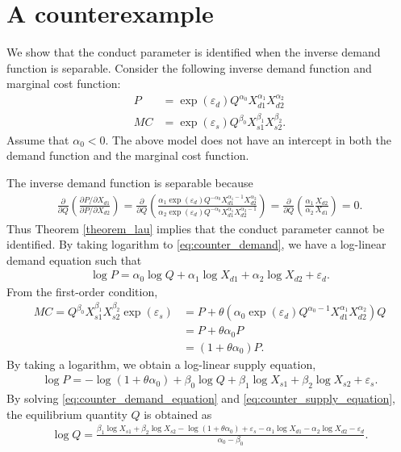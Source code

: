 \documentclass[11pt, a4paper]{article}
\theoremstyle{remark}
\begin{document}
\section{A counterexample}

We show that the conduct parameter is identified when the inverse demand function is separable. 
Consider the following inverse demand function and marginal cost function:
\begin{align}
    P & = \exp(\varepsilon_{d}) Q^{\alpha_0} X_{d1}^{\alpha_1}X_{d2}^{\alpha_2}\label{eq:counter_demand}\\
    MC & = \exp(\varepsilon_{s})Q^{\beta_0} X_{s1}^{\beta_1} X_{s2}^{\beta_2}.\label{eq:counter_mc}
\end{align}
Assume that $\alpha_0 <0$.
The above model does not have an intercept in both the demand function and the marginal cost function. 

The inverse demand function is separable because
\begin{align}
    \frac{\partial }{\partial Q} \left(\frac{\partial P/\partial X_{d1}}{\partial P/\partial X_{d2}} \right) = \frac{\partial }{\partial Q} \left(\frac{\alpha_{1}\exp(\varepsilon_{d}) Q^{-\alpha_0} X_{d1}^{\alpha_1-1}X_{d2}^{\alpha_2}}{\alpha_2\exp(\varepsilon_{d}) Q^{-\alpha_0} X_{d1}^{\alpha_1}X_{d2}^{\alpha_2-1}} \right) =  \frac{\partial }{\partial Q}\left(\frac{\alpha_1}{\alpha_2} \frac{X_{d2}}{X_{d1}} \right)=0.
\end{align}
Thus Theorem \ref{theorem_lau} implies that the conduct parameter cannot be identified.
By taking logarithm to \eqref{eq:counter_demand}, we have a log-linear demand equation such that 
\begin{align}
    \log P = \alpha_0 \log Q + \alpha_1 \log X_{d1}  + \alpha_2 \log X_{d2} + \varepsilon_{d}.\label{eq:counter_demand_equation}
\end{align}
From the first-order condition, 
\begin{align}
    MC = Q^{\beta_0} X_{s1}^{\beta_1}X_{s2}^{\beta_2}\exp(\varepsilon_{s}) & = P + \theta (\alpha_0 \exp(\varepsilon_{d})Q^{\alpha_0-1}X_{d1}^{\alpha_1}X_{d2}^{\alpha_2}) Q\\
    & = P + \theta \alpha_0 P\\
    &= (1 + \theta\alpha_0) P.
\end{align}
By taking a logarithm, we obtain a log-linear supply equation,
\begin{align}
    \log P = - \log(1 + \theta\alpha_0) + \beta_0 \log Q + \beta_1 \log X_{s1}+\beta_2 \log X_{s2} + \varepsilon_{s}.\label{eq:counter_supply_equation}
\end{align}
By solving \eqref{eq:counter_demand_equation} and \eqref{eq:counter_supply_equation}, the equilibrium quantity $Q$ is obtained as
\begin{align}
    \log Q = \frac{\beta_1 \log X_{s1}+\beta_2 \log X_{s2} - \log(1 + \theta\alpha_0)+ \varepsilon_{s} - \alpha_1 \log X_{d1}  - \alpha_2 \log X_{d2} - \varepsilon_{d} }{\alpha_0 - \beta_0}.
\end{align}
\end{document}
